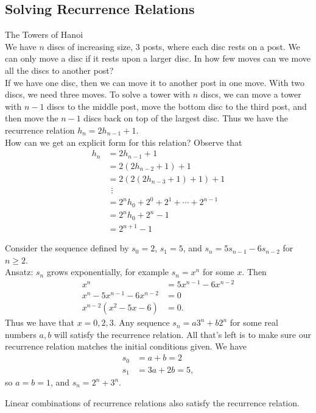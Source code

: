 \documentclass[class=article, crop=false]{standalone}
\begin{document}
  \subsection{Solving Recurrence Relations}
  \begin{example}{The Towers of Hanoi} \\
    We have $n$ discs of increasing size, $3$ posts, where each disc rests on a post. We can only move a disc if it rests upon a larger disc. In how few moves can we move all the discs to another post? \\[10pt]
    If we have one disc, then we can move it to another post in one move. With two discs, we need three moves. To solve a tower with $n$ discs, we can move a tower with $n-1$ discs to the middle post, move the bottom disc to the third post, and then move the $n-1$ discs back on top of the largest disc. Thus we have the recurrence relation $h_n = 2h_{n-1} + 1$. \\[10pt]
    How can we get an explicit form for this relation? Observe that
    \begin{align*}
      h_n &= 2h_{n-1} + 1 \\
          &= 2(2h_{n-2} + 1) + 1 \\
          &= 2(2(2h_{n-3} + 1) + 1) + 1 \\
          &\hspace{5pt}\vdots \\
          &= 2^nh_0 + 2^0 + 2^1 + \dotsb + 2^{n-1} \tag*{Prove using induction}\\
          &= 2^nh_0 + 2^n - 1 \\
          &= 2^{n+1} - 1
    \end{align*}
  \end{example}
  \begin{example}{}
    Consider the sequence defined by $s_0 = 2$, $s_1 = 5$, and $s_n = 5s_{n-1} - 6s_{n-2}$ for $n\geq 2$. \\[10pt]
    Ansatz: $s_n$ grows exponentially, for example $s_n = x^n$ for some $x$. Then
    \begin{align*}
      x^n &= 5x^{n-1} - 6x^{n-2} \\
      x^n - 5x^{n-1} - 6x^{n-2} &= 0 \\
      x^{n-2}(x^2 - 5x - 6) &= 0.
    \end{align*}
    Thus we have that $x = 0, 2, 3$. Any sequence $s_n = a 3^n + b 2^n$ for some real numbers $a, b$ will satisfy the recurrence relation. All that's left is to make sure our recurrence relation matches the initial conditions given. We have
    \begin{align*}
      s_0 &= a + b = 2 \\
      s_1 &= 3a + 2b = 5,
    \end{align*}
    so $a = b = 1$, and $s_n = 2^n + 3^n$.
  \end{example}
  \begin{note}{}
    Linear combinations of recurrence relations also satisfy the recurrence relation.
  \end{note}
\end{document}
